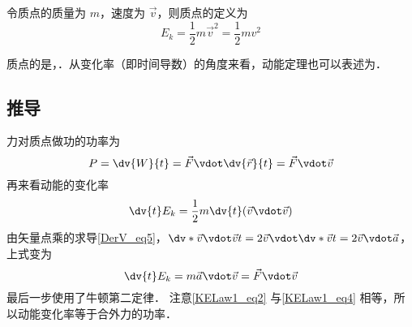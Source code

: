 

令质点的质量为 $m$，速度为 $\vec v$，则质点的定义为
\begin{equation}
E_k = \frac 12 m\vec v^2 = \frac 12 mv^2
\end{equation}

质点的是，．从变化率（即时间导数）的角度来看，动能定理也可以表述为．

\subsection{推导}
力对质点做功的功率为
\begin{equation}\label{KELaw1_eq2}
P = \dv{W}{t} =  \vec F\vdot \dv{\vec r}{t} = \vec F\vdot\vec v
\end{equation}
再来看动能的变化率
\begin{equation}
\dv{t} E_k = \frac 12 m\dv{t} (\vec v\vdot\vec v)
\end{equation}
由矢量点乘的求导\autoref{DerV_eq5}，$\dv*{\vec v\vdot\vec v}{t} = 2\vec v\vdot \dv*{\vec v}{t} = 2\vec v\vdot\vec a$，上式变为
\begin{equation}\label{KELaw1_eq4}
\dv{t} E_k = m\vec a\vdot\vec v = \vec F\vdot\vec v
\end{equation}
最后一步使用了牛顿第二定律．%
注意\autoref{KELaw1_eq2} 与\autoref{KELaw1_eq4} 相等，所以动能变化率等于合外力的功率．
